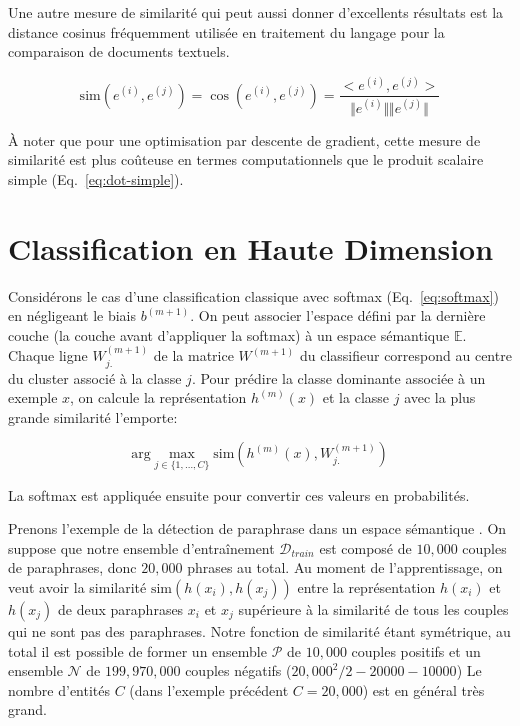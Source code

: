 Une autre mesure de similarité qui peut aussi donner d'excellents résultats est la
distance cosinus fréquemment utilisée en traitement du langage pour la
comparaison de documents textuels.  

\begin{equation}
\textrm{sim}(e^{(i)}, e^{(j)})=\cos (e^{(i)}, e^{(j)}) = \dfrac{ <e^{(i)}, e^{(j)}> }{\Vert e^{(i)}\Vert \Vert e^{(j)}\Vert}
\end{equation}

À noter que pour une optimisation par descente de gradient, cette mesure de
similarité est plus coûteuse en termes computationnels que le produit scalaire
simple (Eq.~\ref{eq:dot-simple}).

\section{Classification en Haute Dimension}
\label{sec:chd}

Considérons le cas d'une classification classique avec softmax
(Eq.~\ref{eq:softmax}) en négligeant le biais $b^{(m+1)}$. On peut associer
l'espace défini par la dernière couche (la couche avant d'appliquer la softmax)
à un espace sémantique $\mathbb{E}$.  Chaque ligne $W^{(m+1)}_{j.}$ de la
matrice $W^{(m+1)}$ du classifieur correspond au centre du cluster associé à
la classe $j$. Pour prédire la classe dominante associée à un exemple $x$, on
calcule la représentation $h^{(m)}(x)$ et la classe $j$ avec la plus grande
similarité l'emporte:

\begin{equation}
\textrm{arg}\max_{j\in\lbrace 1,\dots ,C\rbrace} \textrm{sim}(h^{(m)}(x), W^{(m+1)}_{j.})
\end{equation}

La softmax est appliquée ensuite pour convertir ces valeurs en probabilités.

Prenons l'exemple de la détection de paraphrase dans un espace sémantique
\citep{msr-paraphrase}. On suppose que notre ensemble d'entraînement
$\mathcal{D}_{train}$ est composé de $10,000$ couples de paraphrases, donc
$20,000$ phrases au total. Au moment de l'apprentissage, on veut avoir la similarité
$\textrm{sim}(h(x_i),h(x_j))$ entre la représentation $h(x_i)$ et $h(x_j)$ de
deux paraphrases $x_i$ et $x_j$ supérieure à la similarité de tous les couples
qui ne sont pas des paraphrases. Notre fonction de similarité étant symétrique,
au total il est possible de former un ensemble $\mathcal{P}$ de $10,000$
couples positifs et un ensemble $\mathcal{N}$ de $199,970,000$ couples négatifs
($20,000^2/2 - 20000 - 10000$) Le nombre d'entités $C$ (dans l'exemple
précédent $C=20,000$) est en général très grand.

